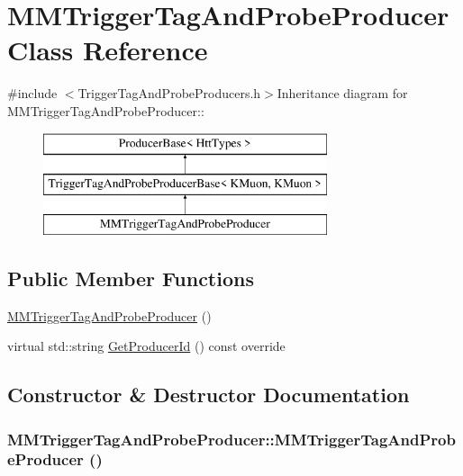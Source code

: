 \hypertarget{classMMTriggerTagAndProbeProducer}{
\section{MMTriggerTagAndProbeProducer Class Reference}
\label{classMMTriggerTagAndProbeProducer}
}


{\ttfamily \#include $<$TriggerTagAndProbeProducers.h$>$}Inheritance diagram for MMTriggerTagAndProbeProducer::\begin{figure}[H]
\begin{center}
\leavevmode
\includegraphics[height=3cm]{classMMTriggerTagAndProbeProducer}
\end{center}
\end{figure}
\subsection*{Public Member Functions}
\begin{DoxyCompactItemize}
\item 
\hyperlink{classMMTriggerTagAndProbeProducer_a1a2e3bcc68a655ea13dff95d949291f0}{MMTriggerTagAndProbeProducer} ()
\item 
virtual std::string \hyperlink{classMMTriggerTagAndProbeProducer_ae05d88154ba8fb500a3b089996291225}{GetProducerId} () const override
\end{DoxyCompactItemize}


\subsection{Constructor \& Destructor Documentation}
\hypertarget{classMMTriggerTagAndProbeProducer_a1a2e3bcc68a655ea13dff95d949291f0}{
\subsubsection[{MMTriggerTagAndProbeProducer}]{\setlength{\rightskip}{0pt plus 5cm}MMTriggerTagAndProbeProducer::MMTriggerTagAndProbeProducer ()}}
\label{classMMTriggerTagAndProbeProducer_a1a2e3bcc68a655ea13dff95d949291f0}


